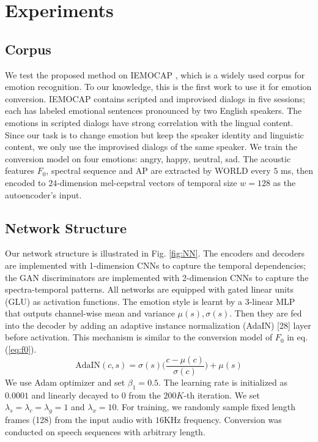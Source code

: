 \documentclass{article}
\begin{document}
\section{Experiments}
\label{sec:exp}

\subsection{Corpus}
We test the proposed method on IEMOCAP \cite{busso2008iemocap}, which is a widely used corpus for emotion recognition. To our knowledge, this is the first work to use it for emotion conversion. IEMOCAP contains scripted and improvised dialogs in five sessions; each has labeled emotional sentences pronounced by two English speakers. The emotions in scripted dialogs have strong correlation with the lingual content. Since our task is to change emotion but keep the speaker identity and linguistic content, we only use the improvised dialogs of the same speaker. We train the conversion model on four emotions: angry, happy, neutral, sad. The acoustic features $F_0$, spectral sequence and AP are extracted by WORLD \cite{morise2016world} every $5$ ms, then encoded to $24$-dimension mel-cepstral vectors of temporal size $w=128$ as the autoencoder's input.


\subsection{Network Structure}
Our network structure is illustrated in Fig. \ref{fig:NN}. The encoders and decoders are implemented with 1-dimension CNNs to capture the temporal dependencies; the GAN discriminators are implemented with 2-dimension CNNs to capture the spectra-temporal patterns. All networks are equipped with gated linear units (GLU) \cite{dauphin2017language} as activation functions. The emotion style is learnt by a $3$-linear MLP that outputs channel-wise mean and variance $\mu(s), \sigma(s)$. Then they are fed into the decoder by adding an adaptive instance normalization (AdaIN) [28] layer before activation. This mechanism is similar to the conversion model of $F_0$ in eq. (\ref{eq:f0}).
\begin{equation}
\text{AdaIN}(c,s) = \sigma(s)\Big(\frac{c-\mu(c)}{\sigma(c)}\Big) + \mu(s)
\end{equation}
We use Adam optimizer and set $\beta_1=0.5$. The learning rate is initialized as $0.0001$ and linearly decayed to $0$ from the $200K$-th iteration. We set $\lambda_s = \lambda_c = \lambda_g = 1$ and $\lambda_x=10$. For training, we randomly sample fixed length frames (128) from the input audio with $16$KHz frequency. Conversion was conducted on speech sequences with arbitrary length.
\end{document}
